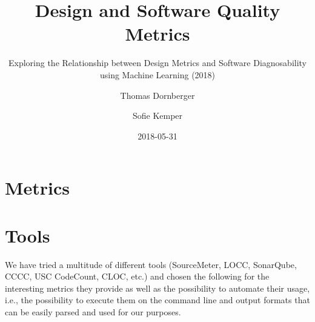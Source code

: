 \documentclass{scrartcl}
\begin{document}
\title{Design and Software Quality Metrics}
\subtitle{Exploring the Relationship between Design Metrics and Software
Diagnosability using Machine Learning (2018)}
\author{Thomas Dornberger \and Sofie Kemper}
\date{2018-05-31}

\maketitle

\section{Metrics}

%

%

%




\section{Tools}

We have tried a multitude of different tools (SourceMeter, LOCC, SonarQube,
CCCC, USC CodeCount, CLOC, etc.) and chosen the following for the interesting
metrics they provide as well as the possibility to automate their usage, i.e.,
the possibility to execute them on the command line and output formats that can
be easily parsed and used for our purposes.

%

%

%


\end{document}
